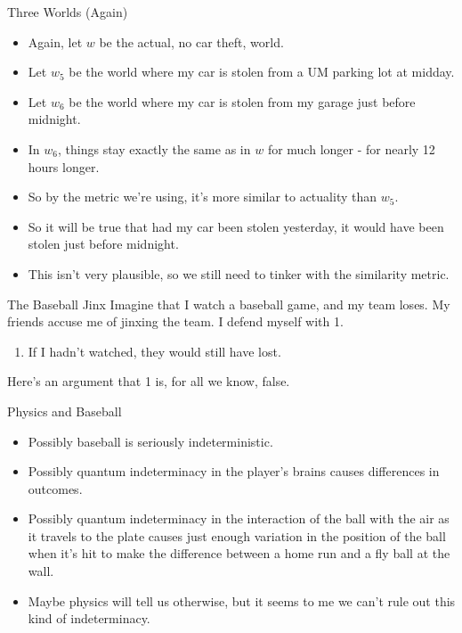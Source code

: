 \documentclass[
  ignorenonframetext,
]{beamer}
\providecommand{\tightlist}{%
  \setlength{\itemsep}{0pt}\setlength{\parskip}{0pt}}
\renewcommand{\,}{\text{, }}
\begin{document}
\begin{frame}{Three Worlds (Again)}
\protect\hypertarget{three-worlds-again}{}
\begin{itemize}
\tightlist
\item
  Again, let \(w\) be the actual, no car theft, world.
\item
  Let \(w_5\) be the world where my car is stolen from a UM parking lot
  at midday.
\item
  Let \(w_6\) be the world where my car is stolen from my garage just
  before midnight.
\item
  In \(w_6\), things stay exactly the same as in \(w\) for much longer -
  for nearly 12 hours longer.
\item
  So by the metric we're using, it's more similar to actuality than
  \(w_5\).
\item
  So it will be true that had my car been stolen yesterday, it would
  have been stolen just before midnight.
\item
  This isn't very plausible, so we still need to tinker with the
  similarity metric.
\end{itemize}
\end{frame}

\begin{frame}{The Baseball Jinx}
\protect\hypertarget{the-baseball-jinx}{}
Imagine that I watch a baseball game, and my team loses. My friends
accuse me of jinxing the team. I defend myself with 1.

\begin{enumerate}
\tightlist
\item
  If I hadn't watched, they would still have lost. \pause 
\end{enumerate}

Here's an argument that 1 is, for all we know, false.
\end{frame}

\begin{frame}{Physics and Baseball}
\protect\hypertarget{physics-and-baseball}{}
\begin{itemize}
\tightlist
\item
  Possibly baseball is seriously indeterministic.
\item
  Possibly quantum indeterminacy in the player's brains causes
  differences in outcomes.
\item
  Possibly quantum indeterminacy in the interaction of the ball with the
  air as it travels to the plate causes just enough variation in the
  position of the ball when it's hit to make the difference between a
  home run and a fly ball at the wall.
\item
  Maybe physics will tell us otherwise, but it seems to me we can't rule
  out this kind of indeterminacy.
\end{itemize}
\end{frame}
\end{document}
